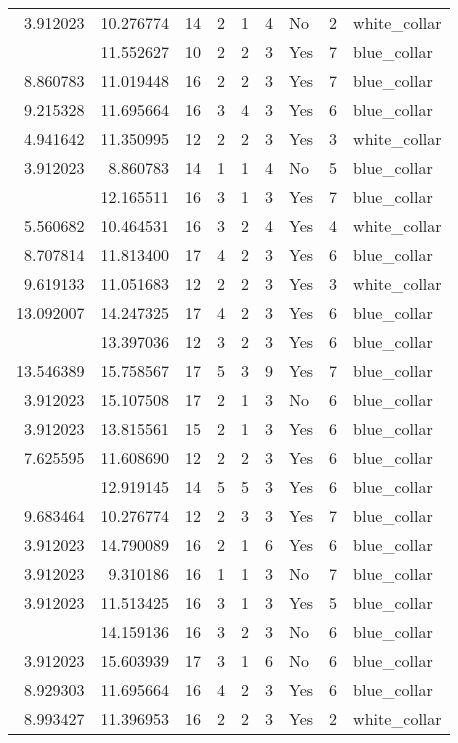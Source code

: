 \documentclass[
]{article}
\begin{document}
\begin{longtable}[t]{rrrrrllrl}
3.912023 & 10.276774 & 14 & 2 & 1 & 4 & No & 2 & white\_collar\\
\addlinespace
9.619133 & 11.552627 & 10 & 2 & 2 & 3 & Yes & 7 & blue\_collar\\
8.860783 & 11.019448 & 16 & 2 & 2 & 3 & Yes & 7 & blue\_collar\\
9.215328 & 11.695664 & 16 & 3 & 4 & 3 & Yes & 6 & blue\_collar\\
4.941642 & 11.350995 & 12 & 2 & 2 & 3 & Yes & 3 & white\_collar\\
3.912023 & 8.860783 & 14 & 1 & 1 & 4 & No & 5 & blue\_collar\\
\addlinespace
3.912023 & 12.165511 & 16 & 3 & 1 & 3 & Yes & 7 & blue\_collar\\
5.560682 & 10.464531 & 16 & 3 & 2 & 4 & Yes & 4 & white\_collar\\
8.707814 & 11.813400 & 17 & 4 & 2 & 3 & Yes & 6 & blue\_collar\\
9.619133 & 11.051683 & 12 & 2 & 2 & 3 & Yes & 3 & white\_collar\\
13.092007 & 14.247325 & 17 & 4 & 2 & 3 & Yes & 6 & blue\_collar\\
\addlinespace
8.860783 & 13.397036 & 12 & 3 & 2 & 3 & Yes & 6 & blue\_collar\\
13.546389 & 15.758567 & 17 & 5 & 3 & 9 & Yes & 7 & blue\_collar\\
3.912023 & 15.107508 & 17 & 2 & 1 & 3 & No & 6 & blue\_collar\\
3.912023 & 13.815561 & 15 & 2 & 1 & 3 & Yes & 6 & blue\_collar\\
7.625595 & 11.608690 & 12 & 2 & 2 & 3 & Yes & 6 & blue\_collar\\
\addlinespace
11.277836 & 12.919145 & 14 & 5 & 5 & 3 & Yes & 6 & blue\_collar\\
9.683464 & 10.276774 & 12 & 2 & 3 & 3 & Yes & 7 & blue\_collar\\
3.912023 & 14.790089 & 16 & 2 & 1 & 6 & Yes & 6 & blue\_collar\\
3.912023 & 9.310186 & 16 & 1 & 1 & 3 & No & 7 & blue\_collar\\
3.912023 & 11.513425 & 16 & 3 & 1 & 3 & Yes & 5 & blue\_collar\\
\addlinespace
9.905984 & 14.159136 & 16 & 3 & 2 & 3 & No & 6 & blue\_collar\\
3.912023 & 15.603939 & 17 & 3 & 1 & 6 & No & 6 & blue\_collar\\
8.929303 & 11.695664 & 16 & 4 & 2 & 3 & Yes & 6 & blue\_collar\\
8.993427 & 11.396953 & 16 & 2 & 2 & 3 & Yes & 2 & white\_collar\\

\end{longtable}
\end{document}
